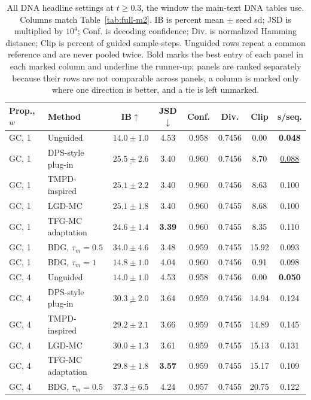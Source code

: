 \documentclass{article}
\begin{document}
\begin{table}[!htbp]
\centering\small
\caption{All DNA headline settings at $t\ge0.3$, the window the main-text DNA tables use. Columns match Table~\ref{tab:full-m2}. IB is percent mean $\pm$ seed sd; JSD is multiplied by $10^4$; Conf. is decoding confidence; Div. is normalized Hamming distance; Clip is percent of guided sample-steps. Unguided rows repeat a common reference and are never pooled twice. Bold marks the best entry of each panel in each marked column and underline the runner-up; panels are ranked separately because their rows are not comparable across panels, a column is marked only where one direction is better, and a tie is left unmarked.}
\label{tab:full-m2-early}
\begin{tabular}{llcccccc}
\toprule
Prop., $w$ & Method & IB$\uparrow$ & JSD$\downarrow$ & Conf. & Div. & Clip & s/seq.\\
\midrule
GC, 1 & Unguided & $14.0\pm1.0$ & 4.53 & 0.958 & 0.7456 & 0.00 & \textbf{0.048}\\
GC, 1 & DPS-style plug-in & $\underline{25.5\pm2.6}$& 3.40 & 0.960 & 0.7456 & 8.70 & \underline{0.088}\\
GC, 1 & TMPD-inspired & $25.1\pm2.2$ & 3.40 & 0.960 & 0.7456 & 8.63 & 0.100\\
GC, 1 & LGD-MC & $25.1\pm1.8$ & 3.40 & 0.960 & 0.7455 & 8.68 & 0.100\\
GC, 1 & TFG-MC adaptation & $24.6\pm1.4$ & \textbf{3.39}& 0.960 & 0.7455 & 8.35 & 0.110\\
GC, 1 & BDG, $\tau_m=0.5$ & $\mathbf{34.0\pm4.6}$& 3.48 & 0.959 & 0.7455 & 15.92 & 0.093\\
GC, 1 & BDG, $\tau_m=1$ & $14.8\pm1.0$ & 4.04 & 0.960 & 0.7456 & 0.91 & 0.098\\
\midrule
GC, 4 & Unguided & $14.0\pm1.0$ & 4.53 & 0.958 & 0.7456 & 0.00 & \textbf{0.050}\\
GC, 4 & DPS-style plug-in & $\underline{30.3\pm2.0}$& 3.64 & 0.959 & 0.7456 & 14.94 & 0.124\\
GC, 4 & TMPD-inspired & $29.2\pm2.1$ & 3.66 & 0.959 & 0.7455 & 14.89 & 0.145\\
GC, 4 & LGD-MC & $30.0\pm1.3$ & 3.61 & 0.959 & 0.7455 & 15.13 & 0.131\\
GC, 4 & TFG-MC adaptation & $29.8\pm1.8$ & \textbf{3.57}& 0.959 & 0.7455 & 15.17 & 0.109\\
GC, 4 & BDG, $\tau_m=0.5$ & $\mathbf{37.3\pm6.5}$& 4.24 & 0.957 & 0.7455 & 20.75 & 0.122\\

\end{tabular}
\end{table}
\end{document}

